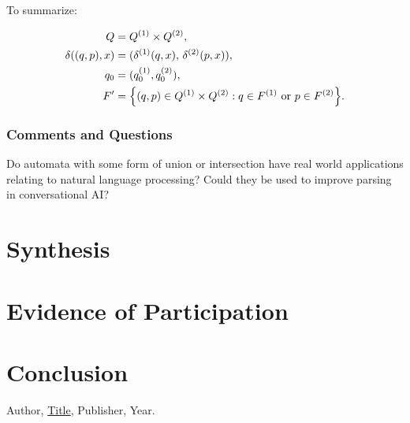 \documentclass{article}
\theoremstyle{theorem}
\theoremstyle{definition}
\theoremstyle{remark}
\begin{document}
To summarize:

\[
\begin{aligned}
Q &= Q^{(1)}\times Q^{(2)}, \\
\delta((q,p),x) &= (\delta^{(1)}(q,x),\,\delta^{(2)}(p,x)), \\
q_0 &= (q_0^{(1)},q_0^{(2)}), \\
F' &= \Bigl\{(q,p) \in Q^{(1)}\times Q^{(2)} : q\in F^{(1)} \text{ or } p\in F^{(2)}\Bigr\}.
\end{aligned}
\]


\subsubsection*{Comments and Questions}

Do automata with some form of union or intersection have real world applications relating to natural language processing? Could they be used to improve parsing in conversational AI? 

\section{Synthesis}

\section{Evidence of Participation}

\section{Conclusion}\label{conclusion}

\begin{thebibliography}{99}
 Author, \href{https://en.wikipedia.org/wiki/LaTeX}{Title}, Publisher, Year.
\end{thebibliography}
\end{document}
